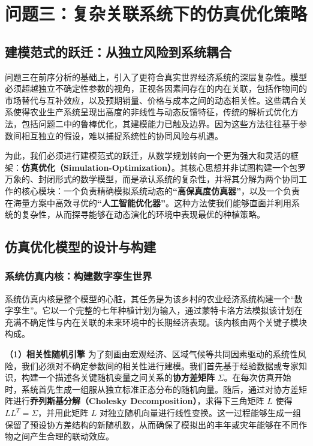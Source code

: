 \documentclass[withoutpreface,bwprint]{cumcmthesis} %
\begin{document}
\section{问题三：复杂关联系统下的仿真优化策略}

\subsection{建模范式的跃迁：从独立风险到系统耦合}

问题三在前序分析的基础上，引入了更符合真实世界经济系统的深层复杂性。模型必须超越独立不确定性参数的视角，正视各因素间存在的内在关联，包括作物间的市场替代与互补效应，以及预期销量、价格与成本之间的动态相关性。这些耦合关系使得农业生产系统呈现出高度的非线性与动态反馈特征，传统的解析式优化方法，包括问题二中的鲁棒优化，其建模能力已触及边界。因为这些方法往往基于参数间相互独立的假设，难以捕捉系统性的协同风险与机遇。

为此，我们必须进行建模范式的跃迁，从数学规划转向一个更为强大和灵活的框架：\textbf{仿真优化（Simulation-Optimization）}。其核心思想并非试图构建一个包罗万象的、封闭形式的数学模型，而是承认系统的复杂性，并将其分解为两个协同工作的核心模块：一个负责精确模拟系统动态的\textbf{“高保真度仿真器”}，以及一个负责在海量方案中高效寻优的\textbf{“人工智能优化器”}。这种方法使我们能够直面并利用系统的复杂性，从而探寻能够在动态演化的环境中表现最优的种植策略。

\subsection{仿真优化模型的设计与构建}

\subsubsection{系统仿真内核：构建数字孪生世界}

系统仿真内核是整个模型的心脏，其任务是为该乡村的农业经济系统构建一个“数字孪生”。它以一个完整的七年种植计划为输入，通过蒙特卡洛方法模拟该计划在充满不确定性与内在关联的未来环境中的长期经济表现。该内核由两个关键子模块构成。

\textbf{（1）相关性随机引擎}
为了刻画由宏观经济、区域气候等共同因素驱动的系统性风险，我们必须对不确定参数间的相关性进行建模。我们首先基于经验数据或专家知识，构建一个描述各关键随机变量之间关系的\textbf{协方差矩阵} $\Sigma$。在每次仿真开始时，系统首先生成一组服从独立标准正态分布的随机向量。随后，通过对协方差矩阵进行\textbf{乔列斯基分解（Cholesky Decomposition）}，求得下三角矩阵 $L$ 使得 $LL^T = \Sigma$，并用此矩阵 $L$ 对独立随机向量进行线性变换。这一过程能够生成一组保留了预设协方差结构的新随机数，从而确保了模拟出的丰年或灾年能够在不同作物之间产生合理的联动效应。
\end{document}
